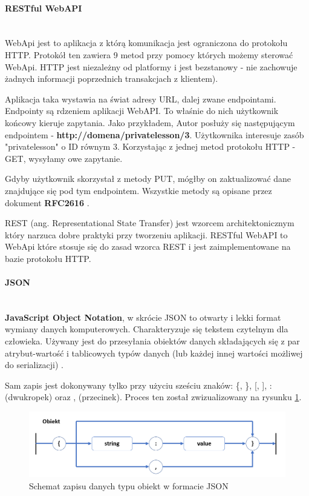 \documentclass[12pt]{article}
\newcommand{\myparagraph}[1]{\paragraph{#1}\mbox{}\\}
\numberwithin{figure}{section}
\begin{document}
\begin{sloppypar}
        \myparagraph{RESTful WebAPI}
        WebApi jest to aplikacja z którą komunikacja jest ograniczona do protokołu HTTP. Protokół ten zawiera 9 metod przy pomocy których możemy sterować WebApi. 
        HTTP jest niezależny od platformy i jest bezstanowy - nie zachowuje żadnych informacji poprzednich transakcjach z klientem). 
        
        Aplikacja taka wystawia na świat adresy URL, dalej zwane endpointami.
        Endpointy są rdzeniem aplikacji WebAPI. To właśnie do nich użytkownik końcowy kieruje zapytania. Jako przykładem, Autor posłuży się następującym endpointem - \textbf{http://domena/privatelesson/3}. Użytkownika interesuje zasób "privatelesson" o ID równym 3. Korzystając z jednej metod protokołu HTTP - GET, wysyłamy owe zapytanie.
        
        Gdyby użytkownik skorzystał z metody PUT, mógłby on zaktualizować dane znajdujące się pod tym endpointem. Wszystkie metody są opisane przez dokument \textbf{RFC2616} \cite{http}.
        
        REST (ang. Representational State Transfer) jest wzorcem architektonicznym który narzuca dobre praktyki przy tworzeniu aplikacji.
        RESTful WebAPI to WebApi które stosuje się do zasad wzorca REST i jest zaimplementowane na bazie protokołu HTTP.
        
        \myparagraph{JSON}
        \indent
        \textbf{JavaScript Object Notation}, w skrócie JSON to otwarty i lekki format wymiany danych komputerowych. Charakteryzuje się tekstem czytelnym dla człowieka. Używany jest do przesyłania obiektów danych składających się z par atrybut-wartość i tablicowych typów danych (lub każdej innej wartości możliwej do serializacji) \cite{json}.
        
        Sam zapis jest dokonywany tylko przy użyciu sześciu znaków: \{, \}, [, ], : (dwukropek) oraz , (przecinek). Proces ten został zwizualizowany na rysunku \ref{fig:json}.
        
        \begin{figure}[H] 
         	\centering
        	\includegraphics[width=1.0\textwidth]{images/chapter_3/json.png}
        	\caption{Schemat zapisu danych typu obiekt w formacie JSON}
        	\label{fig:json}
        \end{figure}
        

\end{sloppypar}
\end{document}
